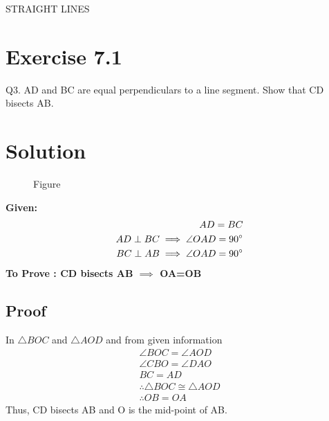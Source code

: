 \documentclass[12pt]{article}
\begin{document}
\begin{center}
\textbf\large{ STRAIGHT LINES}
\end{center}
\section*{Exercise 7.1}
Q3. AD and BC are equal perpendiculars to a line segment. Show that CD bisects AB.
\section*{Solution}

\begin{figure}[!h]
\begin{center}
\resizebox{0.3\linewidth}{!}
{

}
\caption{Figure}
\label{fig:foo}
\end{center}
\end{figure}
\textbf{Given:}
\begin{align}
    AD=BC\\
    AD\perp BC \implies \angle OAD=90\degree\\
    BC\perp AB \implies \angle OAD=90\degree
\end{align}
\textbf{To Prove : CD bisects AB $\implies$ OA=OB}
\subsection{Proof}
In $\triangle{BOC}$ and $\triangle{AOD}$ and from given information
\begin{align}
    \angle BOC = \angle AOD \\
    \angle CBO = \angle DAO \\
    BC=AD\\
    \therefore \triangle{BOC} \cong \triangle{AOD}\\
    \therefore OB = OA
\end{align}
Thus, CD bisects AB and O is the mid-point of AB.
\end{document}

